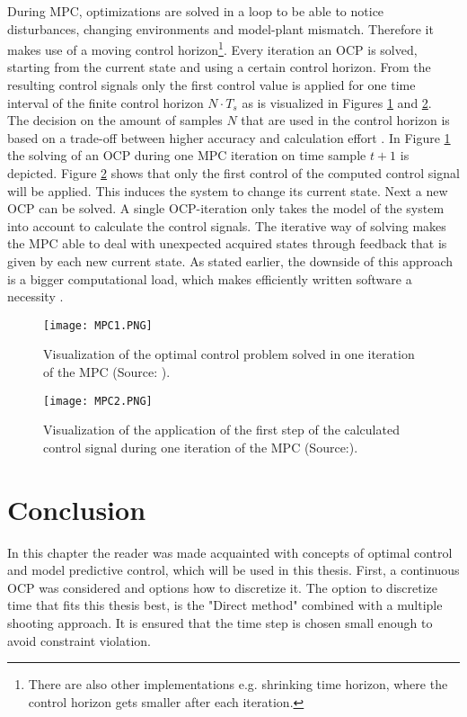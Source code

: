During MPC, optimizations are solved in a loop to be able to notice disturbances, changing environments and model-plant mismatch. Therefore it makes use of a moving control horizon\footnote{There are also other implementations e.g. shrinking time horizon, where the control horizon gets smaller after each iteration.}. Every iteration an OCP is solved, starting from the current state and using a certain control horizon.  From the resulting control signals only the first control value is applied for one time interval of the finite control horizon $N\cdot T_{s}$ as is visualized in Figures \ref{fig:MPC1} and \ref{fig:MPC2}.\\
The decision on the amount of samples $N$ that are used in the control horizon is based on a trade-off between higher accuracy and calculation effort \cite{TongDuySon2019, Mercy2018}. In Figure \ref{fig:MPC1} the solving of an OCP during one MPC iteration on time sample $t+1$ is depicted. Figure \ref{fig:MPC2} shows that only the first control of the computed control signal will be applied.  This induces the system to change its current state. Next a new OCP can be solved. A single OCP-iteration only takes the model of the system into account to calculate the control signals. The iterative way of solving makes the MPC able to deal with unexpected acquired states through feedback that is given by each new current state. As stated earlier, the downside of this approach is a bigger computational load, which makes efficiently written software a necessity \cite{Patrinos2019}.\\

\begin{figure}[h!]
	\centering
	\texttt{[image: MPC1.PNG]}
	\caption{Visualization of the optimal control problem solved in one iteration of the MPC (Source: \cite{Patrinos2019}).}
	\label{fig:MPC1}
\end{figure}

\begin{figure}[h!]
	\centering
	\texttt{[image: MPC2.PNG]}
	\caption{Visualization of the application of the first step of the calculated control signal during one iteration of the MPC (Source:\cite{Patrinos2019}).}
	\label{fig:MPC2}
\end{figure}


\section{Conclusion}
In this chapter the reader was made acquainted with concepts of optimal control and model predictive control, which will be used in this thesis. 
First, a continuous OCP was considered and options how to discretize it. The option to discretize time that fits this thesis best, is the "Direct method" combined with a multiple shooting approach. It is ensured that the time step is chosen small enough to avoid constraint violation.

